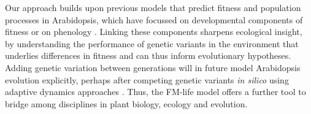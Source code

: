 Our approach builds upon previous models that predict fitness and population
processes in Arabidopsis, which have focussed on developmental components of
fitness or on phenology
\citep{prusinkiewicz_evolution_2007,satake_forecasting_2013,springthorpe_flowering_2015}. Linking
these components sharpens ecological insight, by understanding the performance
of genetic variants in the environment that underlies differences in fitness
\citep[see discussions in][]{burghardt_modeling_2015, doebeli_towards_2017} and
can thus inform evolutionary hypotheses. Adding genetic variation between
generations will in future model Arabidopsis evolution explicitly, perhaps after
competing genetic variants \emph{in silico} using adaptive dynamics approaches
\citep{brannstrom_hitchhikers_2013, weise_mechanistic_2015}.  Thus, the FM-life
model offers a further tool to bridge among disciplines in plant biology,
ecology and evolution.
